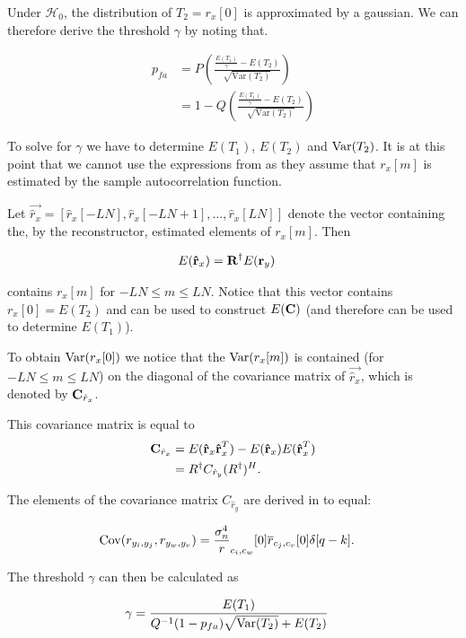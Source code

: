 \documentclass[a4paper, openany, oneside]{memoir}
\begin{document}
Under $\mathcal{H}_0$, the distribution of $T_2 = r_x[0]$ is approximated by a gaussian. We can therefore derive the
threshold $\gamma$ by noting that.

\begin{align*}
p_{fa} &= P\left(\frac{\frac{E\left(T_1\right)}{\gamma} - E\left(T_2\right) }{\sqrt{\text{Var}(T_2)}}\right)\\
&= 1-Q\left(\frac{\frac{E\left(T_1\right)}{\gamma} - E\left(T_2\right) }{\sqrt{\text{Var}(T_2)}}\right) 
\end{align*}

To solve for $\gamma$ we have to determine $E\left(T_1\right)$, $E\left(T_2\right)$ and $\operatorname{Var}(T_2)$. It is at this point that we cannot use the expressions from \cite{zheng2009spectrum} as they assume that $r_x[m]$ is estimated by the sample autocorrelation function. 

Let $\vec{\hat{r}_x} = \left[\hat{r}_x[-LN], \hat{r}_x[-LN+1] , \ldots, \hat{r}_x[LN]\right]$ denote the vector containing the, by the reconstructor, estimated elements of $r_x[m]$. Then 

\begin{align*}
E(\boldsymbol{\mathbf{\hat{r}}}_x) &= \boldsymbol{\mathbf{R}}^{\dagger}E(\boldsymbol{\mathbf{r}}_y)
\end{align*}

contains $r_x[m]$ for $-LN \leq m \leq LN$. Notice that this vector contains $r_x[0] = E(T_2)$ and can be used to construct $E(\boldsymbol{\mathbf{C}})$ (and therefore can be used to determine $E(T_1)$).

To obtain $\operatorname{Var}(r_x[0])$ we notice that the $\operatorname{Var}(r_x[m])$ is contained (for $-LN \leq m \leq LN$) on the diagonal of the covariance matrix of $\vec{\hat{r}_x}$, which is denoted by $\boldsymbol{\mathbf{C}}_{\hat{r}_x}$.

This covariance matrix is equal to
\begin{align*}
\boldsymbol{\mathbf{C}}_{\hat{r}_x} &= E(\boldsymbol{\mathbf{\hat{r}}}_x\boldsymbol{\mathbf{\hat{r}}}_x^T) - E(\boldsymbol{\mathbf{\hat{r}}}_x) E(\boldsymbol{\mathbf{\hat{r}}}_x^T)\\
&= R^{\dagger}C_{\hat{r}_y}(R^{\dagger})^H.
\end{align*}

The elements of the covariance matrix $C_{\hat{r}_y}$ are derived in \cite{ariananda2012compressive} to equal:

\begin{align}
\operatorname{Cov}(r_{{y_i},y_j}, r_{{y_w},y_v}) &= \frac{\sigma_n^4} r_{c_i,c_w}[0]\overline{r}_{c_j,c_v}[0]\delta[q-k].
\end{align}

The threshold $\gamma$ can then be calculated as

\begin{align*}
\gamma &= \frac{E(T_1)}{Q^{-1}(1-p_{fa})\sqrt{\operatorname{Var}(T_2)}+E(T_2)}
\end{align*}


\end{document}
